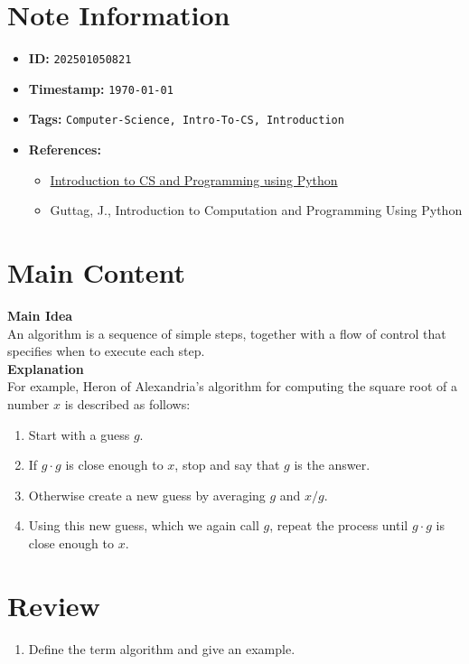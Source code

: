 \clearpage
{}
\label{202501050821}
\renewcommand{\notetitle}{Algorithms}


\section*{Note Information}
\begin{itemize}
  \item \textbf{ID:} \texttt{202501050821}
  \item \textbf{Timestamp:} \texttt{\today \ \currenttime}
  \item \textbf{Tags:} \texttt{Computer-Science, Intro-To-CS, Introduction}
  \item \textbf{References:}
    \begin{itemize}
      \item \href{https://ocw.mit.edu/courses/6-100l-introduction-to-cs-and-programming-using-python-fall-2022/}{Introduction to CS and Programming using Python}
      \item Guttag, J., Introduction to Computation and Programming Using Python
    \end{itemize}
\end{itemize}


\section*{Main Content}
\textbf{Main Idea}\\
An algorithm is a sequence of simple steps, together with a flow of control that specifies when to execute each step.\\

\textbf{Explanation}\\
For example, Heron of Alexandria's algorithm for computing the square root of a number $x$ is described as follows:
\begin{enumerate}
  \item Start with a guess $g$.
  \item If $ g \cdot g $ is close enough to $x$, stop and say that $g$ is the answer.
  \item Otherwise create a new guess by averaging $g$ and $x/g$.
  \item Using this new guess, which we again call $g$, repeat the process until $g \cdot g$ is close enough to $x$.
\end{enumerate}

\section*{Review}
\begin{enumerate}
  \item Define the term algorithm and give an example. 
\end{enumerate}


